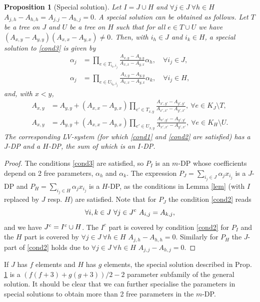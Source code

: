 \documentclass{article}
\newcounter{NN}
\newtheorem{proposition}[NN]{Proposition}
\begin{document}
\begin{proposition}[Special solution] \label{p3}
Let $I=J\cup H$ and $\forall j\in J\ \forall h\in H$ $A_{j,h}-A_{h,h}=A_{j,j}-A_{h,j}= 0$. A special solution can be obtained as follows. Let $T$ be a tree on $J$ and $U$ be a tree on $H$ such that for all $e\in T\cup U$ we have $(A_{x,y}-A_{y,y})(A_{x,x}-A_{y,x})\neq 0$.
Then, with $i_h\in J$ and $i_k\in H$, a special solution to \eqref{cond3} is given by
\begin{align*}
\alpha_j&=\prod_{e\in T_{i_h,i_j}}\frac{A_{x,y}-A_{y,y}}{A_{x,x}-A_{y,x}}\alpha_h,\quad \forall i_j\in J,\\
\alpha_j&=\prod_{e\in U_{i_k,i_j}}\frac{A_{x,y}-A_{y,y}}{A_{x,x}-A_{y,x}}\alpha_k,\quad \forall i_j\in H,
\end{align*}
and, with $x<y$,
\begin{align*}
A_{x,y}&=A_{y,y}+\left(A_{x,x}-A_{y,x}\right)\prod_{e'\in T_{x,y}}\frac{A_{x',y'}-A_{y',y'}}{A_{x',x'}-A_{y',x'}},\ \forall e \in K_J\setminus T,\\
A_{x,y}&=A_{y,y}+\left(A_{x,x}-A_{y,x}\right)\prod_{e'\in U_{x,y}}\frac{A_{x',y'}-A_{y',y'}}{A_{x',x'}-A_{y',x'}},\ \forall e \in K_H\setminus U.
\end{align*}
The corresponding LV-system (for which \eqref{cond1} and \eqref{cond2} are satisfied) has a $J$-DP and a $H$-DP, the sum of which is an $I$-DP.
\end{proposition}
\begin{proof} The conditions \eqref{cond3} are satisfied, so $P_I$ is an $m$-DP whose coefficients depend on 2 free parameters, $\alpha_h$ and $\alpha_k$. The expression $P_J=\sum_{i_j\in J}\alpha_jx_{i_j}$ is a $J$-DP and $P_H=\sum_{i_j\in H}\alpha_jx_{i_j}$ is a $H$-DP, as the conditions in Lemma \ref{lem} (with $I$ replaced by $J$ resp. $H$) are satisfied. Note that for $P_J$ the condition \eqref{cond2} reads
\[
\forall i,k\in J\ \forall j \in J^{\rm c}\ A_{i,j} = A_{k,j},
\]
and we have $J^{\rm c}=I^c\cup H$. The $I^c$ part is covered by condition \eqref{cond2} for $P_I$ and the $H$ part is covered by $\forall j\in J\ \forall h\in H$ $A_{j,h}-A_{h,h}=0$. Similarly for $P_H$ the $J$-part of \eqref{cond2} holds due to $\forall j\in J\ \forall h\in H$ $A_{j,j}-A_{h,j}=0$.
\end{proof}
If $J$ has $f$ elements and $H$ has $g$ elements, the special solution described in Prop. \ref{p3} is a $(f(f + 3)+g(g+3))/2-2$ parameter subfamily of the general solution. It should be clear that we can further specialise the parameters in special solutions to obtain more than 2 free parameters in the $m$-DP.\\
\end{document}
